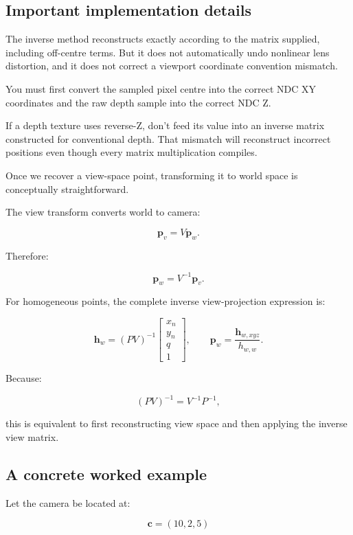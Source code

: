 \subsection{Important implementation details}\label{02-foundations-ii-ch035-important-implementation-details}

The inverse method reconstructs exactly according to the matrix supplied, including off-centre terms. But it does not automatically undo nonlinear lens distortion, and it does not correct a viewport coordinate convention mismatch.

You must first convert the sampled pixel centre into the correct NDC XY coordinates and the raw depth sample into the correct NDC Z.

If a depth texture uses reverse-Z, don't feed its value into an inverse matrix constructed for conventional depth. That mismatch will reconstruct incorrect positions even though every matrix multiplication compiles.

Once we recover a view-space point, transforming it to world space is conceptually straightforward.

The view transform converts world to camera:

\[ \mathbf p_v=V\mathbf p_w. \]

Therefore:

\[ \boxed{ \mathbf p_w=V^{-1}\mathbf p_v. } \]

For homogeneous points, the complete inverse view-projection expression is:

\[ \boxed{ \mathbf h_w=(PV)^{-1} \begin{bmatrix} x_n\\y_n\\q\\1 \end{bmatrix}, \qquad \mathbf p_w=\frac{\mathbf h_{w,xyz}}{h_{w,w}}. } \]

Because:

\[ (PV)^{-1}=V^{-1}P^{-1}, \]

this is equivalent to first reconstructing view space and then applying the inverse view matrix.

\subsection{A concrete worked example}\label{02-foundations-ii-ch035-a-concrete-worked-example}

Let the camera be located at:

\[ \mathbf c=(10,2,5) \]

